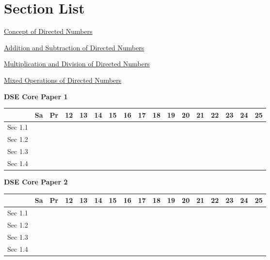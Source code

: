 \documentclass[12pt, a4paper]{article}
\begin{document}
\section*{Section List}
\begin{enumx}[label=Sec 1.\arabic*\ ]
\item \hyperref[section:1-1-1]{Concept of Directed Numbers}
\item \hyperref[section:1-1-2]{Addition and Subtraction of Directed Numbers}
\item \hyperref[section:1-1-3]{Multiplication and Division of Directed Numbers}
\item \hyperref[section:1-1-4]{Mixed Operations of Directed Numbers}
\end{enumx}
\begin{absolutelynopagebreak}
\begin{center}
\textbf{DSE Core Paper 1}
\end{center}
\begin{center}
\begin{tabular}{|l|c|c|c|c|c|c|c|c|c|c|c|c|c|c|c|c|}
\hline
        & Sa & Pr & 12 & 13 & 14 & 15 & 16 & 17 & 18 & 19 & 20 & 21 & 22 & 23 & 24 & 25 \\\hline\hline
Sec 1.1 &  &  &  &  &  &  &  &  &  &  &  &  &  &  &  &  \\\hline
Sec 1.2 &  &  &  &  &  &  &  &  &  &  &  &  &  &  &  &  \\\hline
Sec 1.3 &  &  &  &  &  &  &  &  &  &  &  &  &  &  &  &  \\\hline
Sec 1.4 &  &  &  &  &  &  &  &  &  &  &  &  &  &  &  &  \\\hline
\end{tabular}
\end{center}
\end{absolutelynopagebreak}
\begin{absolutelynopagebreak}
\begin{center}
\textbf{DSE Core Paper 2}
\end{center}
\begin{center}
\begin{tabular}{|l|c|c|c|c|c|c|c|c|c|c|c|c|c|c|c|c|}
\hline
        & Sa & Pr & 12 & 13 & 14 & 15 & 16 & 17 & 18 & 19 & 20 & 21 & 22 & 23 & 24 & 25 \\\hline\hline
Sec 1.1 &  &  &  &  &  &  &  &  &  &  &  &  &  &  &  &  \\\hline
Sec 1.2 &  &  &  &  &  &  &  &  &  &  &  &  &  &  &  &  \\\hline
Sec 1.3 &  &  &  &  &  &  &  &  &  &  &  &  &  &  &  &  \\\hline
Sec 1.4 &  &  &  &  &  &  &  &  &  &  &  &  &  &  &  &  \\\hline
\end{tabular}
\end{center}
\end{absolutelynopagebreak}
\end{document}
